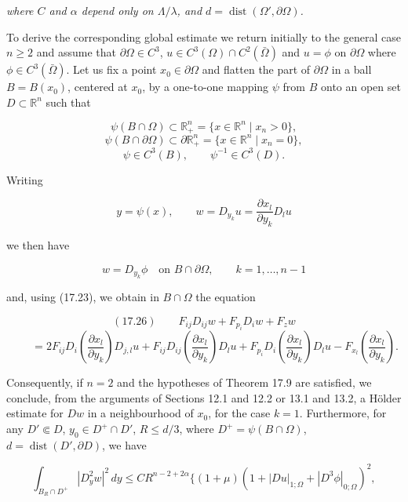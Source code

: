 \noindent \textit{where $C$ and $\alpha$ depend only on $\Lambda/\lambda$, and $d = \operatorname{dist}(\Omega', \partial\Omega)$.}

\medskip

\noindent To derive the corresponding global estimate we return initially to the general case $n \ge 2$ and assume that $\partial\Omega \in C^{3}$, $u \in C^{3}(\Omega) \cap C^{2}(\bar{\Omega})$ and $u = \phi$ on $\partial\Omega$ where $\phi \in C^{3}(\bar{\Omega})$. Let us fix a point $x_{0} \in \partial\Omega$ and flatten the part of $\partial\Omega$ in a ball $B = B(x_{0})$, centered at $x_{0}$, by a one-to-one mapping $\psi$ from $B$ onto an open set $D \subset \mathbb{R}^{n}$ such that

\[
\psi(B \cap \Omega) \subset \mathbb{R}^{n}_{+} = \{x \in \mathbb{R}^{n} \mid x_{n} > 0\},
\]
\[
\psi(B \cap \partial\Omega) \subset \partial\mathbb{R}^{n}_{+} = \{x \in \mathbb{R}^{n} \mid x_{n} = 0\},
\]
\[
\psi \in C^{3}(B),\qquad \psi^{-1} \in C^{3}(D).
\]

\noindent Writing

\[
 y = \psi(x),\qquad w = D_{y_{k}}u = \frac{\partial x_{l}}{\partial y_{k}} D_{l}u
\]

\noindent we then have

\[
 w = D_{y_{k}}\phi \quad \text{on } B \cap \partial\Omega,\qquad k = 1, \ldots, n-1
\]

\noindent and, using (17.23), we obtain in $B \cap \Omega$ the equation

\[
(17.26)\qquad F_{ij}D_{ij}w + F_{p_{i}}D_{i}w + F_{z}w
\]
\[
\qquad = 2F_{ij}D_{i}\!\left(\frac{\partial x_{l}}{\partial y_{k}}\right)D_{j,l}u + F_{ij}D_{ij}\!\left(\frac{\partial x_{l}}{\partial y_{k}}\right)D_{l}u + F_{p_{i}}D_{i}\!\left(\frac{\partial x_{l}}{\partial y_{k}}\right)D_{l}u - F_{x_{l}}\!\left(\frac{\partial x_{l}}{\partial y_{k}}\right).
\]

\noindent Consequently, if $n = 2$ and the hypotheses of Theorem 17.9 are satisfied, we conclude, from the arguments of Sections 12.1 and 12.2 or 13.1 and 13.2, a Hölder estimate for $Dw$ in a neighbourhood of $x_{0}$, for the case $k = 1. $ Furthermore, for any $D' \Subset D$, $y_{0} \in D^{+} \cap D'$, $R \le d/3$, where $D^{+} = \psi(B \cap \Omega)$, $d = \operatorname{dist}(D', \partial D)$, we have

\[
\int_{B_{R} \cap D^{+}} |D_{y}^{2}w|^{2}\,dy \le CR^{n-2+2\alpha}\{(1 + \mu)(1 + |Du|_{1;\Omega} + |D^{3}\phi|_{0;\Omega})^{2},
\]






